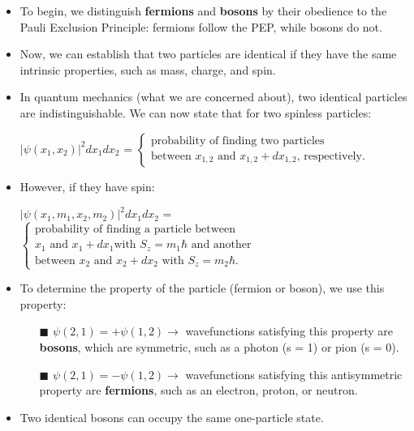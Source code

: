 \documentclass[12pt, letterpaper, twoside]{article}
\begin{document}
\begin{itemize}
    \item To begin, we distinguish \textbf{fermions} and \textbf{bosons} by their obedience to the Pauli Exclusion Principle: fermions follow the PEP, while bosons do not.
    \item Now, we can establish that two particles are identical if they have the same intrinsic properties, such as mass, charge, and spin.
    \item In quantum mechanics (what we are concerned about), two identical particles are indistinguishable. We can now state that for two spinless particles:
    \begin{center}
        $\big|\psi(x_1,x_2)\big|^2dx_1dx_2$ = $\begin{cases}
            \text{probability of finding two particles} \\ \text{between } x_{1,2} \text{ and } x_{1,2} + dx_{1,2} \text{, respectively}.
        \end{cases}$
    \end{center}
    \item However, if they have spin:
    \begin{center}
        $\big|\psi(x_1, m_1, x_2, m_2)\big|^2dx_1dx_2$ = $\begin{cases}
            \text{probability of finding a particle between } \\ x_1 \text{ and }x_1 + dx_1 \text{with } S_z = m_1\hbar \text { and another} \\
            \text{between } x_2 \text{ and } x_2 + dx_2 \text{ with } S_z = m_2\hbar.
        \end{cases}$
    \end{center}
    \item To determine the property of the particle (fermion or boson), we use this property:
    \begin{itemize}
        \item[$\blacksquare$] $\psi(2,1) = +\psi(1,2) \longrightarrow$ wavefunctions satisfying this property are \textbf{bosons}, which are symmetric, such as a photon (s = 1) or pion (s = 0). 
        \item[$\blacksquare$] $\psi(2,1) = -\psi(1,2) \longrightarrow$ wavefunctions satisfying this antisymmetric property are \textbf{fermions}, such as an electron, proton, or neutron. 
    \end{itemize}
    \item Two identical bosons can occupy the same one-particle state.

\end{itemize}
\end{document}
